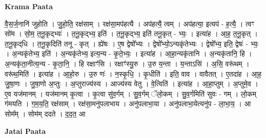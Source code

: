 \documentclass[17pt]{extarticle}
\begin{document}
\textbf{Krama Paata} \newline

वै॒स॒र्ज॒नानि॑ जुहोति । जु॒हो॒ति॒ रक्ष॑साम् । रक्ष॑सा॒मप॑हत्यै । अप॑हत्यै॒ त्वम् । अप॑हत्या॒ इत्यप॑ - ह॒त्यै॒ । त्वꣳ सो॑म । सो॒म॒ त॒नू॒कृद्भ्यः॑ । त॒नू॒कृद्भ्य॒ इति॑ । त॒नू॒कृद्भ्य॒ इति॑ तनू॒कृत् - भ्यः॒ । इत्या॑ह । आ॒ह॒ त॒नू॒कृत् । त॒नू॒कृद्‌धि । त॒नू॒कृदिति॑ तनू - कृत् । ह्ये॑षः । ए॒ष द्वेषो᳚भ्यः । द्वेषो᳚भ्यो॒ऽन्यकृ॑तेभ्यः । द्वेषो᳚भ्य॒ इति॒ द्वेषः॑ - भ्यः॒ । अ॒न्यकृ॑तेभ्य॒ इति॑ । अ॒न्यकृ॑तेभ्य॒ इत्य॒न्य - कृ॒ते॒भ्यः॒ । इत्या॑ह । आ॒हा॒न्यकृ॑तानि । अ॒न्यकृ॑तानि॒ हि । अ॒न्यकृ॑ता॒नीत्य॒न्य - कृ॒ता॒नि॒ । हि रक्षाꣳ॑सि । रक्षाꣳ॑स्यु॒रु । उ॒रु य॒न्ता । य॒न्ताऽसि॑ । अ॒सि॒ वरू॑थम् । वरू॑थ॒मिति॑ । इत्या॑ह । आ॒हो॒रु । उ॒रु णः॑ । न॒स्कृ॒धि॒ । कृ॒धीति॑ । इति॒ वाव । वावैतत् । ए॒तदा॑ह । आ॒ह॒ जु॒षा॒णः । जु॒षा॒णो अ॒प्तुः । अ॒प्तुराज्य॑स्य । आज्य॑स्य वेतु । वे॒त्विति॑ । इत्या॑ह । आ॒हा॒प्तुम् । अ॒प्तुमे॒व । ए॒व यज॑मानम् । यज॑मानम् कृ॒त्वा । कृ॒त्वा सु॑व॒र्गम् । सु॒व॒र्गम् ॅलो॒कम् । सु॒व॒र्गमिति॑ सुवः - गम् । लो॒कम् ग॑मयति । ग॒म॒य॒ति॒ रक्ष॑साम् । रक्ष॑सा॒मनु॑पलाभाय । अनु॑पलाभा॒या । अनु॑पलाभा॒येत्यनु॑प - ला॒भा॒य॒ । आ सोम᳚म् । सोम॑म् ददते । द॒द॒त॒ आ \newline

\textbf{Jatai Paata} \newline
\end{document}
